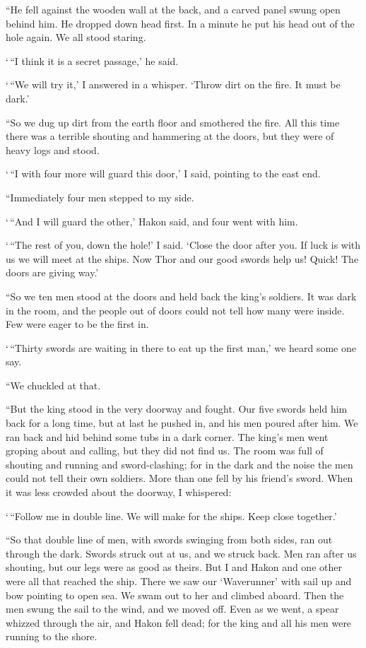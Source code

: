 ``He fell against the wooden wall at the back, and a carved panel swung
open behind him. He dropped down head first. In a minute he put his head
out of the hole again. We all stood staring.

`\,``I think it is a secret passage,' he said.

`\,``We will try it,' I answered in a whisper. `Throw dirt on the fire. It
must be dark.'

``So we dug up dirt from the earth floor and smothered the fire. All this
time there was a terrible shouting and hammering at the doors, but they
were of heavy logs and stood.

`\,``I with four more will guard this door,' I said, pointing to the east
end.

``Immediately four men stepped to my side.

`\,``And I will guard the other,' Hakon said, and four went with him.

`\,``The rest of you, down the hole!' I said. `Close the door after you. If
luck is with us we will meet at the ships. Now Thor and our good swords
help us! Quick! The doors are giving way.'

``So we ten men stood at the doors and held back the king's soldiers. It
was dark in the room, and the people out of doors could not tell how
many were inside. Few were eager to be the first in.

`\,``Thirty swords are waiting in there to eat up the first man,' we heard
some one say.

``We chuckled at that.

``But the king stood in the very doorway and fought. Our five swords held
him back for a long time, but at last he pushed in, and his men poured
after him. We ran back and hid behind some tubs in a dark corner. The
king's men went groping about and calling, but they did not find us. The
room was full of shouting and running and sword-clashing; for in the
dark and the noise the men could not tell their own soldiers. More than
one fell by his friend's sword. When it was less crowded about the
doorway, I whispered:

`\,``Follow me in double line. We will make for the ships. Keep close
together.'

``So that double line of men, with swords swinging from both sides, ran
out through the dark. Swords struck out at us, and we struck back. Men
ran after us shouting, but our legs were as good as theirs. But I and
Hakon and one other were all that reached the ship. There we saw our
`Waverunner' with sail up and bow pointing to open sea. We swam out to
her and climbed aboard. Then the men swung the sail to the wind, and we
moved off. Even as we went, a spear whizzed through the air, and Hakon
fell dead; for the king and all his men were running to the shore.

